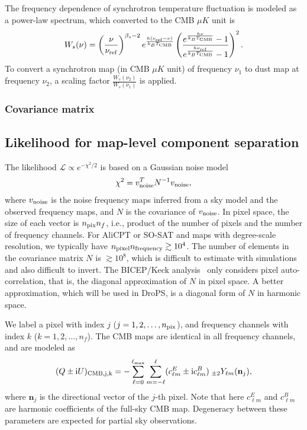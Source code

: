 \documentclass[12pt, a4paper]{ctexart} %
\begin{document}
The frequency dependence of synchrotron temperature fluctuation is modeled as a power-law spectrum, which converted to the CMB $\mu K$ unit is
\begin{equation}
  W_s(\nu) = \left(\frac{\nu}{\nu_{\rm ref}}\right)^{\beta_s-2}e^{\frac{h(\nu_{\rm ref} - \nu)}{k_BT_{\rm CMB}}}\left(\frac{e^{\frac{h\nu}{k_BT_{\rm CMB}}}-1}{e^{\frac{h\nu_{\rm ref}}{k_BT_{\rm CMB}}}-1}\right)^2. \label{eq:sync_w}
\end{equation}
To convert a synchrotron map (in CMB $\mu K$ unit) of frequency $\nu_1$ to dust map at frequency $\nu_2$, a scaling factor $\frac{W_s(\nu_2)}{W_s(\nu_1)}$ is applied.

\subsubsection{Covariance matrix}

\subsection{Likelihood for map-level component separation \label{sec:sgld_like}}

The likelihood $\mathcal{L}\propto e^{-\chi^2/2}$ is based on a Gaussian noise model
\begin{equation}
  \chi^2 = v_{\rm noise}^TN^{-1}v_{\rm noise},
\end{equation}
where $v_{\rm noise}$ is the noise frequency maps inferred from a sky model and the observed frequency maps, and $N$ is the covariance of $v_{\rm noise}$. In pixel space, the size of each vector is $n_{\rm pix} n_f$, i.e., product of the number of pixels and the number of frequency channels. For AliCPT or SO-SAT and maps with degree-scale resolution, we typically have $n_{\rm pixel} n_{\rm frequency} \gtrsim 10^4$. The number of elements in the covariance matrix $N$ is $\gtrsim 10^8$, which is difficult to estimate with simulations and also difficult to invert. The BICEP/Keck analysis~\cite{BKmap} only considers pixel auto-correlation, that is, the diagonal approximation of $N$ in pixel space. A better approximation, which will be used in DroPS, is a diagonal form of $N$ in harmonic space.

We label a pixel with index $j$ ($j=1, 2, \ldots, n_{\rm pix}$), and frequency channels with index $k$ ($k = 1, 2, \ldots, n_f$). The CMB maps are identical in all frequency channels, and are modeled as
\begin{equation}
  (Q\pm \mathrm{i}U)_{\rm CMB, j, k} = -\sum_{\ell = 0}^{\ell_{\max}}\sum_{m=-\ell}^\ell (c_{\ell m}^E\pm \mathrm{i} c_{\ell m}^B)\;_{\pm 2}Y_{\ell m}(\mathbf{n}_j), \label{eq:CMB_comp}
\end{equation}
where $\mathbf{n}_j$ is the directional vector of the $j$-th pixel. Note that here $c_{\ell m}^E$ and $c_{\ell m}^B$ are harmonic coefficients of the full-sky CMB map. Degeneracy between these parameters are expected for partial sky observations. 
\end{document}
